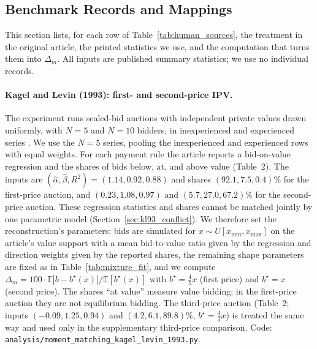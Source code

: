 \documentclass[acmsmall,screen,review]{acmart}
\newenvironment{revblock}{\color{blue}}{}
\newenvironment{revblock}{}{}
\begin{document}
\begin{revblock}
\subsection{Benchmark Records and Mappings}\label{app:human_records}
This section lists, for each row of Table~\ref{tab:human_sources}, the treatment in the original article, the printed statistics we use, and the computation that turns them into $\Delta_m$. All inputs are published summary statistics; we use no individual records.

\paragraph{Kagel and Levin (1993): first- and second-price IPV.}
The experiment runs sealed-bid auctions with independent private values drawn uniformly, with $N=5$ and $N=10$ bidders, in inexperienced and experienced series \citep{kagel1993independent}. We use the $N=5$ series, pooling the inexperienced and experienced rows with equal weights. For each payment rule the article reports a bid-on-value regression and the shares of bids below, at, and above value (Table~2). The inputs are $(\hat\alpha,\hat\beta,R^2)=(1.14,0.92,0.88)$ and shares $(92.1,7.5,0.4)\%$ for the first-price auction, and $(0.23,1.08,0.97)$ and $(5.7,27.0,67.2)\%$ for the second-price auction. These regression statistics and shares cannot be matched jointly by one parametric model (Section~\ref{sec:kl93_conflict}). We therefore set the reconstruction's parameters: bids are simulated for $x\sim U[x_{\min},x_{\max}]$ on the article's value support with a mean bid-to-value ratio given by the regression and direction weights given by the reported shares, the remaining shape parameters are fixed as in Table~\ref{tab:mixture_fit}, and we compute $\Delta_m=100\cdot\mathbb{E}|b-b^\star(x)|/\mathbb{E}[b^\star(x)]$ with $b^\star=\tfrac45 x$ (first price) and $b^\star=x$ (second price). The shares ``at value'' measure value bidding; in the first-price auction they are not equilibrium bidding. The third-price auction (Table~2; inputs $(-0.09,1.25,0.94)$ and $(4.2,6.1,89.8)\%$, $b^\star=\tfrac43x$) is treated the same way and used only in the supplementary third-price comparison. Code: \texttt{analysis/moment\_matching\_kagel\_levin\_1993.py}.


\end{revblock}
\end{document}
